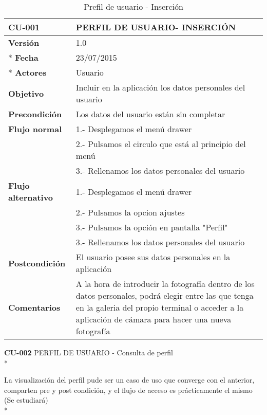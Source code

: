 \documentclass[../pfc.tex]{subfiles}
\begin{document}
	\begin{table}[H]
		\centering
		\begin{tabular}[t]{|p{3cm}|p{9.5cm}|}
				\hline \textbf{CU-001} & \textbf{PERFIL DE USUARIO- INSERCIÓN} \\*
				\hline\hline \textbf{Versión} & 1.0 \\ *
				\hline\hline \textbf{Fecha} & 23/07/2015 \\ *
				\hline\textbf{Actores} 	& Usuario\\*
				\hline \textbf{Objetivo} & Incluir en la aplicación los datos personales del usuario\\* 			
				\hline \textbf{Precondición} & Los datos del usuario están sin completar \\* 
				\hline \textbf{Flujo normal} & 1.- Desplegamos el menú drawer \\* 
											 & 2.- Pulsamos el circulo que está al principio del menú \\*	
											 & 3.- Rellenamos los datos personales del usuario\\*	
				\hline \textbf{Flujo alternativo} & 1.- Desplegamos el menú drawer \\* 
 												  & 2.- Pulsamos la opcion ajustes \\*	
												  & 3.- Pulsamos la opción en pantalla "Perfil" \\*	
												  & 3.- Rellenamos los datos personales del usuario \\*	
				\hline \textbf{Postcondición} & El usuario posee sus datos personales en la aplicación \\* 
				\hline \textbf{Comentarios}   & A la hora de introducir la fotografía dentro de los datos personales, podrá elegir entre las que tenga en la galeria del propio terminal o acceder a la aplicación de cámara para hacer una nueva fotografía\\*
				\hline
			\end{tabular}
			\caption{Prefil de usuario - Inserción}
			\label{tabla:caso001}
	\end{table}
	
	
	
	\textbf{CU-002}	PERFIL DE USUARIO - Consulta de perfil\\*
	
	La visualización del perfil pude ser un caso de uso que converge con el anterior, comparten pre y post condición, y el flujo de acceso es prácticamente el mismo (Se estudiará)\\*
	
\end{document}
